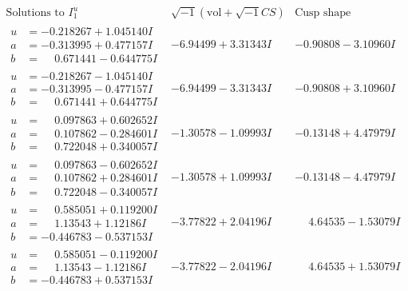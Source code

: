 \documentclass[1p]{elsarticle_modified}
\theoremstyle{definition}
\newcommand{\I}{\sqrt{-1}}
\begin{document}
$$\begin{array}{c|c|c}  
\text{Solutions to }I^u_{1}& \I (\text{vol} + \sqrt{-1}CS) & \text{Cusp shape}\\
 \hline 
\begin{aligned}
u &= -0.218267 + 1.045140 I \\
a &= -0.313995 + 0.477157 I \\
b &= \phantom{-}0.671441 - 0.644775 I\end{aligned}
 & -6.94499 + 3.31343 I & -0.90808 - 3.10960 I \\ \hline\begin{aligned}
u &= -0.218267 - 1.045140 I \\
a &= -0.313995 - 0.477157 I \\
b &= \phantom{-}0.671441 + 0.644775 I\end{aligned}
 & -6.94499 - 3.31343 I & -0.90808 + 3.10960 I \\ \hline\begin{aligned}
u &= \phantom{-}0.097863 + 0.602652 I \\
a &= \phantom{-}0.107862 - 0.284601 I \\
b &= \phantom{-}0.722048 + 0.340057 I\end{aligned}
 & -1.30578 - 1.09993 I & -0.13148 + 4.47979 I \\ \hline\begin{aligned}
u &= \phantom{-}0.097863 - 0.602652 I \\
a &= \phantom{-}0.107862 + 0.284601 I \\
b &= \phantom{-}0.722048 - 0.340057 I\end{aligned}
 & -1.30578 + 1.09993 I & -0.13148 - 4.47979 I \\ \hline\begin{aligned}
u &= \phantom{-}0.585051 + 0.119200 I \\
a &= \phantom{-}1.13543 + 1.12186 I \\
b &= -0.446783 - 0.537153 I\end{aligned}
 & -3.77822 + 2.04196 I & \phantom{-}4.64535 - 1.53079 I \\ \hline\begin{aligned}
u &= \phantom{-}0.585051 - 0.119200 I \\
a &= \phantom{-}1.13543 - 1.12186 I \\
b &= -0.446783 + 0.537153 I\end{aligned}
 & -3.77822 - 2.04196 I & \phantom{-}4.64535 + 1.53079 I \\ \hline\begin{aligned}

\end{aligned}
\end{array}$$
\end{document}
